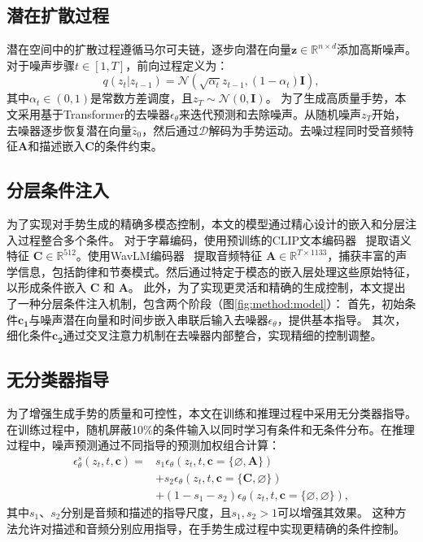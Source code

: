 \subsection{潜在扩散过程}
潜在空间中的扩散过程遵循马尔可夫链，逐步向潜在向量$\mathbf{z} \in \mathbb{R}^{n\times d}$添加高斯噪声。对于噪声步骤$t \in [1,T]$，前向过程定义为：
\begin{equation}
  q(z_t|z_{t-1}) = \mathcal{N}(\sqrt{\alpha_t}z_{t-1}, (1-\alpha_t)\mathbf{I}),
\end{equation}
其中$\alpha_t \in (0,1)$是常数方差调度，且$z_T \sim \mathcal{N}(0, \mathbf{I})$。
为了生成高质量手势，本文采用基于Transformer的去噪器$\epsilon_\theta$来迭代预测和去除噪声。从随机噪声$z_T$开始，去噪器逐步恢复潜在向量$\hat{z}_0$，然后通过$\mathcal{D}$解码为手势运动。去噪过程同时受音频特征$\mathbf{A}$和描述嵌入$\mathbf{C}$的条件约束。

\subsection{分层条件注入}
为了实现对手势生成的精确多模态控制，本文的模型通过精心设计的嵌入和分层注入过程整合多个条件。
对于字幕编码，使用预训练的CLIP文本编码器~\cite{radford2021clip} 提取语义特征 $\mathbf{C} \in \mathbb{R}^{512}$。使用WavLM编码器~\cite{chen2022wavlm} 提取音频特征 $\mathbf{A} \in \mathbb{R}^{T\times1133}$，捕获丰富的声学信息，包括韵律和节奏模式。然后通过特定于模态的嵌入层处理这些原始特征，以形成条件嵌入 $\mathbf{C}$ 和 $\mathbf{A}$。
此外，为了实现更灵活和精确的生成控制，本文提出了一种分层条件注入机制，包含两个阶段（图\ref{fig:method:model}）：
首先，初始条件$\mathbf{c_1}$与噪声潜在向量和时间步嵌入串联后输入去噪器$\epsilon_\theta$，提供基本指导。
其次，细化条件$\mathbf{c_2}$通过交叉注意力机制在去噪器内部整合，实现精细的控制调整。

\subsection{无分类器指导}
为了增强生成手势的质量和可控性，本文在训练和推理过程中采用无分类器指导\cite{ho2022classifier}。在训练过程中，随机屏蔽10\%的条件输入以同时学习有条件和无条件分布。在推理过程中，噪声预测通过不同指导的预测加权组合计算：
\begin{equation}
  \begin{split}
      \epsilon_\theta^s(z_t, t, \mathbf{c}) = & s_1 \epsilon_\theta(z_t, t, \mathbf{c}=\{\varnothing, \mathbf{A}\}) \\
      & + s_2 \epsilon_\theta(z_t, t, \mathbf{c}=\{\mathbf{C}, \varnothing\}) \\
      & + (1 - s_1 - s_2) \epsilon_\theta(z_t, t, \mathbf{c}=\{\varnothing, \varnothing\}),
  \end{split}
\end{equation}
其中$s_1$、$s_2$分别是音频和描述的指导尺度，且$s_1, s_2 > 1$可以增强其效果。
这种方法允许对描述和音频分别应用指导，在手势生成过程中实现更精确的条件控制。

